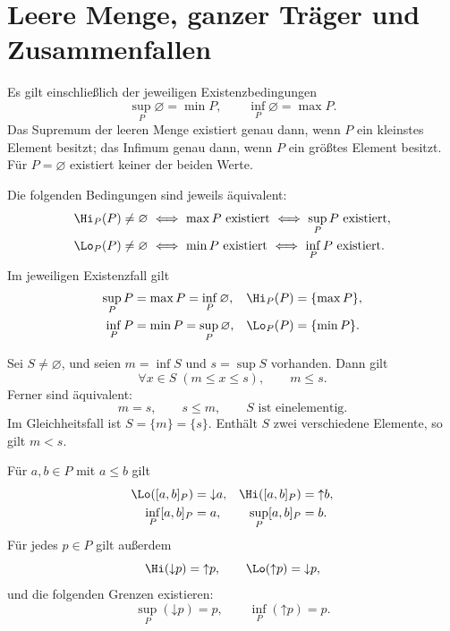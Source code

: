 \section{Leere Menge, ganzer Träger und Zusammenfallen}

\begin{theorem}
\label{b13guide:thm:empty-extrema}
Es gilt einschließlich der jeweiligen Existenzbedingungen
\[
 \sup_P\varnothing=\min P,\qquad
 \inf_P\varnothing=\max P.
\]
Das Supremum der leeren Menge existiert genau dann, wenn $P$
ein kleinstes Element besitzt; das Infimum genau dann, wenn
$P$ ein größtes Element besitzt. Für $P=\varnothing$ existiert
keiner der beiden Werte.
\end{theorem}

\begin{theorem}
\label{b13guide:thm:carrier}
Die folgenden Bedingungen sind jeweils äquivalent:
\[
\begin{aligned}
 \Hi_P(P)\ne\varnothing
 &\ \Longleftrightarrow\ \max P\text{ existiert}
 \ \Longleftrightarrow\ \sup_P P\text{ existiert},\\
 \Lo_P(P)\ne\varnothing
 &\ \Longleftrightarrow\ \min P\text{ existiert}
 \ \Longleftrightarrow\ \inf_P P\text{ existiert}.
\end{aligned}
\]
Im jeweiligen Existenzfall gilt
\[
\begin{aligned}
 \sup_P P&=\max P=\inf_P\varnothing,&
 \Hi_P(P)&=\{\max P\},\\
 \inf_P P&=\min P=\sup_P\varnothing,&
 \Lo_P(P)&=\{\min P\}.
\end{aligned}
\]
\end{theorem}

\begin{theorem}
\label{b13guide:thm:collapse}
Sei $S\ne\varnothing$, und seien $m=\inf S$ und $s=\sup S$
vorhanden. Dann gilt
\[
 \forall x\in S\;(m\leq x\leq s),\qquad m\leq s.
\]
Ferner sind äquivalent:
\[
 m=s,\qquad s\leq m,\qquad S\text{ ist einelementig}.
\]
Im Gleichheitsfall ist $S=\{m\}=\{s\}$.
Enthält $S$ zwei verschiedene Elemente, so gilt $m<s$.
\end{theorem}

\begin{theorem}
\label{b13guide:thm:interval-values}
Für $a,b\in P$ mit $a\leq b$ gilt
\[
\begin{aligned}
 \Lo([a,b]_P)&=\mathord\downarrow a,&
 \Hi([a,b]_P)&=\mathord\uparrow b,\\
 \inf_P[a,b]_P&=a,& \sup_P[a,b]_P&=b.
\end{aligned}
\]
Für jedes $p\in P$ gilt außerdem
\[
 \Hi(\mathord\downarrow p)=\mathord\uparrow p,\qquad
 \Lo(\mathord\uparrow p)=\mathord\downarrow p,
\]
und die folgenden Grenzen existieren:
\[
 \sup_P(\mathord\downarrow p)=p,\qquad
 \inf_P(\mathord\uparrow p)=p.
\]
\end{theorem}
